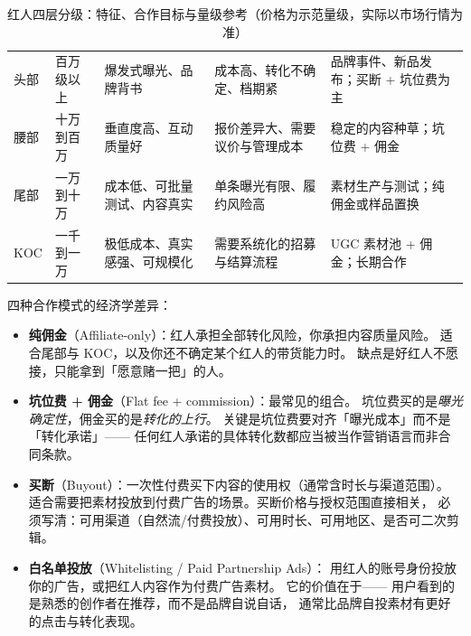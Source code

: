 \begin{table}[htbp]
\centering
\caption{红人四层分级：特征、合作目标与量级参考（价格为示范量级，实际以市场行情为准）}
\label{tab:influencer-tier}
\small
\begin{tabularx}{\textwidth}{L{1.8cm} L{1.7cm} L{2.6cm} L{2.6cm} Y}
\toprule
{} &  &  &  &  \\
\midrule
头部 & 百万级以上 & 爆发式曝光、品牌背书 & 成本高、转化不确定、档期紧 & 品牌事件、新品发布；买断 + 坑位费为主 \\
\addlinespace
腰部 & 十万到百万 & 垂直度高、互动质量好 & 报价差异大、需要议价与管理成本 & 稳定的内容种草；坑位费 + 佣金 \\
\addlinespace
尾部 & 一万到十万 & 成本低、可批量测试、内容真实 & 单条曝光有限、履约风险高 & 素材生产与测试；纯佣金或样品置换 \\
\addlinespace
KOC & 一千到一万 & 极低成本、真实感强、可规模化 & 需要系统化的招募与结算流程 & UGC 素材池 + 佣金；长期合作 \\
\bottomrule
\end{tabularx}
\end{table}

四种合作模式的经济学差异：

\begin{itemize}
  \item \textbf{纯佣金}（Affiliate-only）：红人承担全部转化风险，你承担内容质量风险。
        适合尾部与 KOC，以及你还不确定某个红人的带货能力时。
        缺点是好红人不愿接，只能拿到「愿意赌一把」的人。
  \item \textbf{坑位费 + 佣金}（Flat fee + commission）：最常见的组合。
        坑位费买的是\emph{曝光确定性}，佣金买的是\emph{转化的上行}。
        关键是坑位费要对齐「曝光成本」而不是「转化承诺」——
        任何红人承诺的具体转化数都应当被当作营销语言而非合同条款。
  \item \textbf{买断}（Buyout）：一次性付费买下内容的使用权（通常含时长与渠道范围）。
        适合需要把素材投放到付费广告的场景。买断价格与授权范围直接相关，
        必须写清：可用渠道（自然流/付费投放）、可用时长、可用地区、是否可二次剪辑。
  \item \textbf{白名单投放}（Whitelisting / Paid Partnership Ads）：
        用红人的账号身份投放你的广告，或把红人内容作为付费广告素材。
        它的价值在于——
        用户看到的是熟悉的创作者在推荐，而不是品牌自说自话，
        通常比品牌自投素材有更好的点击与转化表现。
\end{itemize}

